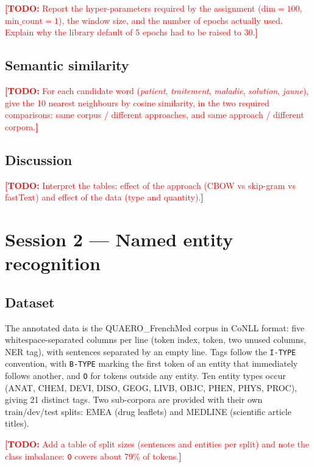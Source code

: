 \documentclass[11pt,a4paper]{article}
\newcommand{\TODO}[1]{\textcolor{red}{\textbf{[TODO:} #1\textbf{]}}}
\begin{document}
\TODO{Report the hyper-parameters required by the assignment ($\mathrm{dim}=100$,
$\mathrm{min\_count}=1$), the window size, and the number of epochs actually used. Explain why
the library default of 5 epochs had to be raised to 30.}

\subsection{Semantic similarity}
\label{sec:similarity}

\TODO{For each candidate word (\emph{patient}, \emph{traitement}, \emph{maladie},
\emph{solution}, \emph{jaune}), give the 10 nearest neighbours by cosine similarity, in the two
required comparisons: same corpus / different approaches, and same approach / different
corpora.}

\subsection{Discussion}
\label{sec:tp1-discussion}

\TODO{Interpret the tables: effect of the approach (CBOW vs skip-gram vs fastText) and effect
of the data (type and quantity).}

\section{Session 2 --- Named entity recognition}
\label{sec:tp2}

\subsection{Dataset}
\label{sec:ner-data}

The annotated data is the QUAERO\_FrenchMed corpus in CoNLL format: five whitespace-separated
columns per line (token index, token, two unused columns, NER tag), with sentences separated by
an empty line. Tags follow the \texttt{I-TYPE} convention, with \texttt{B-TYPE} marking the
first token of an entity that immediately follows another, and \texttt{O} for tokens outside
any entity. Ten entity types occur (ANAT, CHEM, DEVI, DISO, GEOG, LIVB, OBJC, PHEN, PHYS,
PROC), giving 21 distinct tags. Two sub-corpora are provided with their own train/dev/test
splits: EMEA (drug leaflets) and MEDLINE (scientific article titles).

\TODO{Add a table of split sizes (sentences and entities per split) and note the class
imbalance: \texttt{O} covers about 79\% of tokens.}
\end{document}
